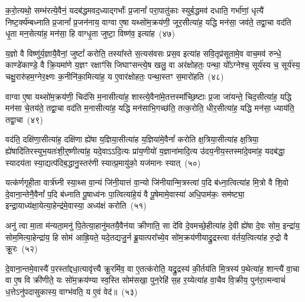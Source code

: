 क॒रो॒त्यथो॒ सम्भ॑रत्ये॒वैनं॒ यदब॑द्धमवद॒ध्याद्गर्भाः᳚ प्र॒जानां᳚ परा॒पातु॑काः स्युर्ब॒द्धमव॑ दधाति॒ गर्भा॑णां॒ धृत्यै॑ निष्ट॒र्क्य॑म्बध्नाति प्र॒जानां᳚ प्र॒जन॑नाय॒ वाग्वा ए॒षा यथ्सो॑म॒क्रय॑णी॒ जूर॒सीत्या॑ह॒ यद्धि मन॑सा॒ जव॑ते॒ तद्वा॒चा वद॑ति धृ॒ता मन॒सेत्या॑ह॒ मन॑सा॒ हि वाग्धृ॒ता जुष्टा॒ विष्ण॑व॒ इत्या॑ह~(४७)

य॒ज्ञो वै विष्णु॑र्य॒ज्ञायै॒वैनां॒ जुष्टां᳚ करोति॒ तस्या᳚स्ते स॒त्यस॑वसः प्रस॒व इत्या॑ह सवि॒तृप्र॑सूतामे॒व वाच॒मव॑ रुन्धे॒ काण्डे॑काण्डे॒ वै क्रि॒यमा॑णे य॒ज्ञꣳ रक्षाꣳ॑सि जिघाꣳसन्त्ये॒ष खलु॒ वा अर॑क्षोहतः॒ पन्था॒ यो᳚\-ऽग्नेश्च॒ सूर्य॑स्य च॒ सूर्य॑स्य॒ चक्षु॒रारु॑हम॒ग्नेर॒क्ष्णः क॒नीनि॑का॒मित्या॑ह॒ य ए॒वार॑क्षोहतः॒ पन्था॒स्तꣳ स॒मारो॑हति~(४८)

वाग्वा ए॒षा यथ्सो॑म॒क्रय॑णी॒ चिद॑सि म॒नासीत्या॑ह॒ शास्त्ये॒वैना॑मे॒तत्तस्मा᳚च्छि॒ष्टाः प्र॒जा जा॑यन्ते॒ चिद॒सीत्या॑ह॒ यद्धि मन॑सा चे॒तय॑ते॒ तद्वा॒चा वद॑ति म॒नासीत्या॑ह॒ यद्धि मन॑साभि॒गच्छ॑ति॒ तत्क॒रोति॒ धीर॒सीत्या॑ह॒ यद्धि मन॑सा॒ ध्याय॑ति॒ तद्वा॒चा~(४९)

वद॑ति॒ दक्षि॑णा॒सीत्या॑ह॒ दक्षि॑णा ह्ये॑षा य॒ज्ञिया॒सीत्या॑ह य॒ज्ञिया॑मे॒वैनां᳚ करोति क्ष॒त्रिया॒सीत्या॑ह क्ष॒त्रिया॒ ह्ये॑षादि॑तिरस्युभ॒यतः॑शी॒र्॒\mbox{}ष्णीत्या॑ह॒ यदे॒वाऽऽदि॒त्यः प्रा॑य॒णीयो॑ य॒ज्ञाना॑मादि॒त्य उ॑दय॒नीय॒स्तस्मा॑दे॒वमा॑ह॒ यदब॑द्धा॒ स्यादय॑ता स्या॒द्यत्प॑दिब॒द्धानु॒स्तर॑णी स्यात्प्र॒मायु॑को॒ यज॑मानः स्यात्~(५०)

यत्क॑र्णगृही॒ता वार्त्र॑घ्नी स्या॒थ्स वा॒न्यं जि॑नी॒यात्तं वा॒न्यो जि॑नीयान्मि॒त्रस्त्वा॑ प॒दि ब॑ध्ना॒त्वित्या॑ह मि॒त्रो वै शि॒वो दे॒वाना॒न्तेनै॒वैनां᳚ प॒दि ब॑ध्नाति पू॒षाध्व॑नः पा॒त्वित्या॑हे॒यं वै पू॒षेमामे॒वास्या॑ अधि॒पाम॑कः॒ सम॑ष्ट्या॒ इन्द्रा॒याध्य॑क्षा॒येत्या॒हेन्द्र॑मे॒वास्या॒ अध्य॑क्षं करोति~(५१)

अनु॑ त्वा मा॒ता म॑न्यता॒मनु॑ पि॒तेत्या॒हानु॑मतयै॒वैन॑या क्रीणाति॒ सा दे॑वि दे॒वमच्छे॒हीत्या॑ह दे॒वी ह्ये॑षा दे॒वः सोम॒ इन्द्रा॑य॒ सोम॒मित्या॒हेन्द्रा॑य॒ हि सोम॑ आह्रि॒यते॒ यदे॒तद्यजु॒र्न ब्रू॒यात्परा᳚च्ये॒व सो॑म॒क्रय॑णीयाद्रु॒द्रस्त्वा व॑र्तय॒त्वित्या॑ह रु॒द्रो वै क्रू॒रः~(५२)

दे॒वाना॒न्तमे॒वास्यै॑ प॒रस्ता᳚द्दधा॒त्यावृ॑त्त्यै क्रू॒रमि॑व॒ वा ए॒तत्क॑रोति॒ यद्रु॒द्रस्य॑ की॒र्तय॑ति मि॒त्रस्य॑ प॒थेत्या॑ह॒ शान्त्यै॑ वा॒चा वा ए॒ष वि क्री॑णीते॒ यः सो॑म॒क्रय॑ण्या स्व॒स्ति सोम॑सखा॒ पुन॒रेहि॑ स॒ह र॒य्येत्या॑ह वा॒चैव वि॒क्रीय॒ पुन॑रा॒त्मन्वाचं॑ ध॒त्ते\-ऽनु॑पदासुकास्य॒ वाग्भ॑वति॒ य ए॒वं वेद॑॥~(५३)

{\anuvakamend[{सत॑नुं॒ विष्ण॑व॒ इत्या॑ह स॒मारो॑हति॒ ध्याय॑ति॒ तद्वा॒चा यज॑मानः स्यात्करोति क्रू॒रो वेद॑}]}%

